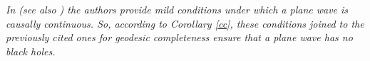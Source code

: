 \begin{remark} {\em In \cite[Thm. 6.9]{EHRLICH_1992} (see also \cite{minguzzi12:causal_kam}) the authors provide mild conditions under which a plane wave is causally continuous. So, according to Corollary \ref{cc}, these conditions joined to the previously cited ones for geodesic completeness ensure that a plane wave has no black holes.
}
\end{remark}



%




